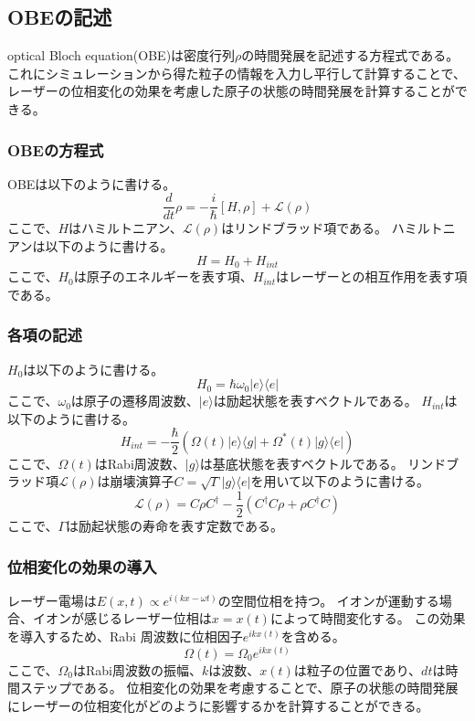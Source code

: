 \subsection{OBEの記述}
optical Bloch equation(OBE)は密度行列$\rho$の時間発展を記述する方程式である。これにシミュレーションから得た粒子の情報を入力し平行して計算することで、レーザーの位相変化の効果を考慮した原子の状態の時間発展を計算することができる。
\subsubsection{OBEの方程式}
     OBEは以下のように書ける。
    \begin{equation}
        \frac{d}{dt}\rho = -\frac{i}{\hbar}[H,\rho] + \mathcal{L}(\rho)
    \end{equation}
    ここで、$H$はハミルトニアン、$\mathcal{L}(\rho)$はリンドブラッド項である。
    ハミルトニアンは以下のように書ける。
    \begin{equation}
        H = H_0 + H_{int}
    \end{equation}
    ここで、$H_0$は原子のエネルギーを表す項、$H_{int}$はレーザーとの相互作用を表す項である。
\subsubsection{各項の記述}
    $H_0$は以下のように書ける。
    \begin{equation}
        H_0 = \hbar\omega_0 |e\rangle\langle e|
    \end{equation}
    ここで、$\omega_0$は原子の遷移周波数、$|e\rangle$は励起状態を表すベクトルである。
    $H_{int}$は以下のように書ける。
    \begin{equation}
        H_{int}=-\frac{\hbar}{2}\left(\Omega(t)|e\rangle\langle g|+\Omega^*(t)|g\rangle\langle e|\right)
    \end{equation}
    ここで、$\Omega(t)$はRabi周波数、$|g\rangle$は基底状態を表すベクトルである。
    リンドブラッド項$\mathcal{L}(\rho)$は崩壊演算子$C=\sqrt{\Gamma}|g\rangle\langle e|$を用いて以下のように書ける。
    \begin{equation}
        \mathcal{L}(\rho)=C\rho C^\dagger-\frac12
        \left(C^\dagger C\rho+\rho C^\dagger C\right)
    \end{equation}
    ここで、$\Gamma$は励起状態の寿命を表す定数である。
\subsubsection{位相変化の効果の導入}
レーザー電場は$E(x,t)\propto e^{i(kx-\omega t)}$の空間位相を持つ。
イオンが運動する場合、イオンが感じるレーザー位相は$x=x(t)$によって時間変化する。
この効果を導入するため、Rabi 周波数に位相因子$e^{ikx(t)}$を含める。
    \begin{equation}
        \Omega(t)=\Omega_0 e^{ikx(t)}
    \end{equation}
    ここで、$\Omega_0$はRabi周波数の振幅、$k$は波数、$x(t)$は粒子の位置であり、$dt$は時間ステップである。
    位相変化の効果を考慮することで、原子の状態の時間発展にレーザーの位相変化がどのように影響するかを計算することができる。
